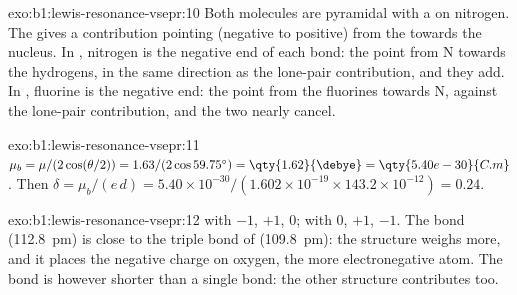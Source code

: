 \begin{solution}{exo:b1:lewis-resonance-vsepr:10}
Both molecules are pyramidal with a  on nitrogen. The 
gives a contribution pointing (negative to positive) from the 
towards the nucleus. In , nitrogen is the negative end of each
bond: the  point from N towards the hydrogens, in the same
direction as the lone-pair contribution, and they add. In ,
fluorine is the negative end: the  point from the fluorines
towards N, against the lone-pair contribution, and the two nearly cancel.
\end{solution}

\begin{solution}{exo:b1:lewis-resonance-vsepr:11}
$\mu_b = \mu/(2\cos(\theta/2)) = 1.63/(2\cos 59.75^\circ) =
\qty{1.62}{\debye} = \qty{5.40e-30}{C.m}$. Then $\delta = \mu_b/(e\,d) =
5.40 \times 10^{-30}/(1.602 \times 10^{-19} \times 143.2 \times 10^{-12})
= 0.24$.
\end{solution}

\begin{solution}{exo:b1:lewis-resonance-vsepr:12}
 with  $-1$, $+1$, $0$;  with $0$,
$+1$, $-1$. The  bond (\qty{112.8}{pm}) is close to the triple
bond of  (\qty{109.8}{pm}): the structure  weighs more,
and it places the negative charge on oxygen, the more electronegative
atom. The  bond is however shorter than a single bond: the other
structure contributes too.
\end{solution}

